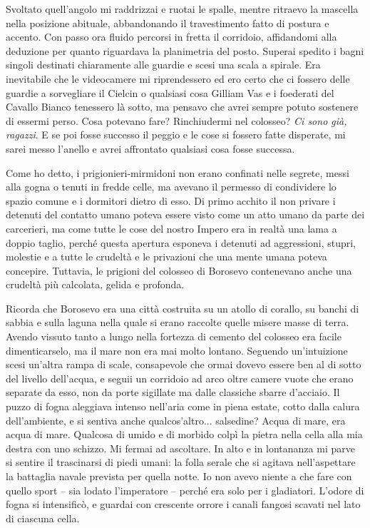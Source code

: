 Svoltato quell'angolo mi raddrizzai e ruotai le spalle, mentre ritraevo
la mascella nella posizione abituale, abbandonando il travestimento
fatto di postura e accento. Con passo ora fluido percorsi in fretta il
corridoio, affidandomi alla deduzione per quanto riguardava la
planimetria del posto. Superai spedito i bagni singoli destinati
chiaramente alle guardie e scesi una scala a spirale. Era inevitabile
che le videocamere mi riprendessero ed ero certo che ci fossero delle
guardie a sorvegliare il Cielcin o qualsiasi cosa Gilliam Vas e i
foederati del Cavallo Bianco tenessero là sotto, ma pensavo che avrei
sempre potuto sostenere di essermi perso. Cosa potevano fare?
Rinchiudermi nel colosseo? \emph{Ci sono già, ragazzi}. E se poi fosse
successo il peggio e le cose si fossero fatte disperate, mi sarei messo
l'anello e avrei affrontato qualsiasi cosa fosse successa.

Come ho detto, i prigionieri-mirmidoni non erano confinati nelle
segrete, messi alla gogna o tenuti in fredde celle, ma avevano il
permesso di condividere lo spazio comune e i dormitori dietro di esso.
Di primo acchito il non privare i detenuti del contatto umano poteva
essere visto come un atto umano da parte dei carcerieri, ma come tutte
le cose del nostro Impero era in realtà una lama a doppio taglio, perché
questa apertura esponeva i detenuti ad aggressioni, stupri, molestie e a
tutte le crudeltà e le privazioni che una mente umana poteva concepire.
Tuttavia, le prigioni del colosseo di Borosevo contenevano anche una
crudeltà più calcolata, gelida e profonda.

Ricorda che Borosevo era una città costruita su un atollo di corallo, su
banchi di sabbia e sulla laguna nella quale si erano raccolte quelle
misere masse di terra. Avendo vissuto tanto a lungo nella fortezza di
cemento del colosseo era facile dimenticarselo, ma il mare non era mai
molto lontano. Seguendo un'intuizione scesi un'altra rampa di scale,
consapevole che ormai dovevo essere ben al di sotto del livello
dell'acqua, e seguii un corridoio ad arco oltre camere vuote che erano
separate da esso, non da porte sigillate ma dalle classiche sbarre
d'acciaio. Il puzzo di fogna aleggiava intenso nell'aria come in piena
estate, cotto dalla calura dell'ambiente, e si sentiva anche
qualcos'altro... salsedine? Acqua di mare, era acqua di mare. Qualcosa
di umido e di morbido colpì la pietra nella cella alla mia destra con
uno schizzo. Mi fermai ad ascoltare. In alto e in lontananza mi parve si
sentire il trascinarsi di piedi umani: la folla serale che si agitava
nell'aspettare la battaglia navale prevista per quella notte. Io non
avevo niente a che fare con quello sport -- sia lodato l'imperatore --
perché era solo per i gladiatori. L'odore di fogna si intensificò, e
guardai con crescente orrore i canali fangosi scavati nel lato di
ciascuna cella.

